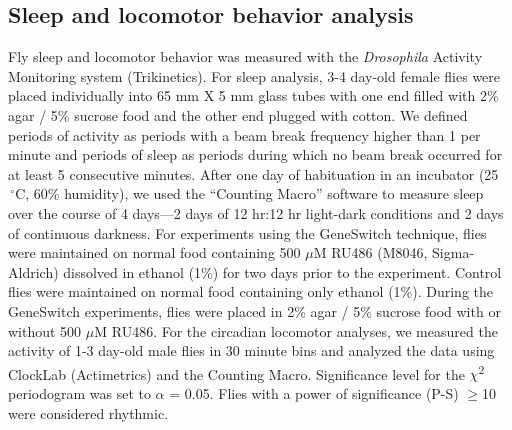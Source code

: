 \subsection*{Sleep and locomotor behavior analysis}

Fly sleep and locomotor behavior was measured with the \emph{Drosophila} Activity Monitoring system (Trikinetics).
For sleep analysis, 3-4 day-old female flies were placed individually into 65 mm X 5 mm glass tubes with one end filled with 2\% agar / 5\% sucrose food and the other end plugged with cotton.
We defined periods of activity as periods with a beam break frequency higher than 1 per minute and periods of sleep as periods during which no beam break occurred for at least 5 consecutive minutes\cite{Shaw:2000ui}.
After one day of habituation in an incubator (25$\,^{\circ}\mathrm{C}$, 60\% humidity), we used the ``Counting Macro'' software\cite{pfeiffenberger:2010ab} to measure sleep over the course of 4 days---2 days of 12 hr:12 hr light-dark conditions and 2 days of continuous darkness.
For experiments using the GeneSwitch technique, flies were maintained on normal food containing 500 $\mu$M RU486 (M8046, Sigma-Aldrich) dissolved in ethanol (1\%) for two days prior to the experiment.
Control flies were maintained on normal food containing only ethanol (1\%).
During the GeneSwitch experiments, flies were placed in 2\% agar / 5\% sucrose food with or without 500 $\mu$M RU486.
For the circadian locomotor analyses, we measured the activity of 1-3 day-old male flies in 30 minute bins and analyzed the data using ClockLab (Actimetrics) and the Counting Macro. Significance level for the $\chi$\textsuperscript{2} periodogram was set to $\alpha$ = 0.05.
Flies with a power of significance (P-S) $\geq$10 were considered rhythmic.

